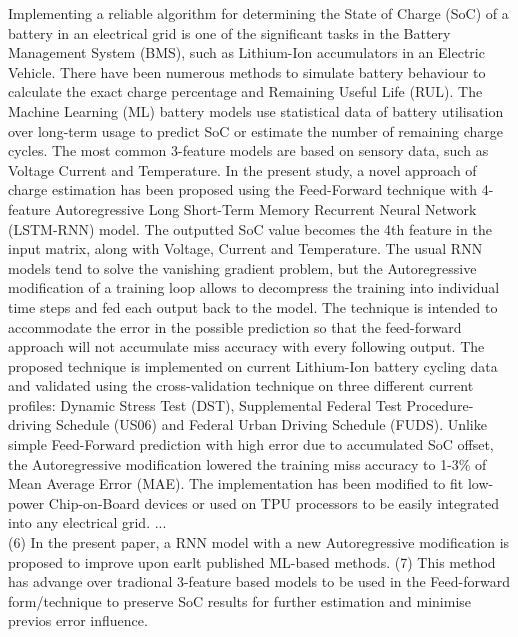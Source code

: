 %
%
{
Implementing a reliable algorithm for determining the State of Charge (SoC) of a battery in an electrical grid is one of the significant tasks in the Battery Management System (BMS), such as Lithium-Ion accumulators in an Electric Vehicle.
There have been numerous methods to simulate battery behaviour to calculate the exact charge percentage and Remaining Useful Life (RUL).
The Machine Learning (ML) battery models use statistical data of battery utilisation over long-term usage to predict SoC or estimate the number of remaining charge cycles.
The most common 3-feature models are based on sensory data, such as Voltage Current and Temperature.
In the present study, a novel approach of charge estimation has been proposed using the Feed-Forward technique with 4-feature Autoregressive Long Short-Term Memory Recurrent Neural Network (LSTM-RNN) model.
The outputted SoC value becomes the 4th feature in the input matrix, along with Voltage, Current and Temperature.
The usual RNN models tend to solve the vanishing gradient problem, but the Autoregressive modification of a training loop allows to decompress the training into individual time steps and fed each output back to the model.
The technique is intended to accommodate the error in the possible prediction so that the feed-forward approach will not accumulate miss accuracy with every following output.
The proposed technique is implemented on current Lithium-Ion battery cycling data and validated using the cross-validation technique on three different current profiles: Dynamic Stress Test (DST), Supplemental Federal Test Procedure-driving Schedule (US06) and Federal Urban Driving Schedule (FUDS).
Unlike simple Feed-Forward prediction with high error due to accumulated  SoC offset, the Autoregressive modification lowered the training miss accuracy to 1-3\% of Mean Average Error (MAE).
The implementation has been modified to fit low-power Chip-on-Board devices or used on TPU processors to be easily integrated into any electrical grid.
}
%
{
 ... \\
 (6) In the present paper, a RNN model with a new Autoregressive modification is proposed to improve upon earlt published ML-based methods.
 (7) This method has advange over tradional 3-feature based models to be used in the Feed-forward form/technique to preserve SoC results for further estimation and minimise previos error influence.
}